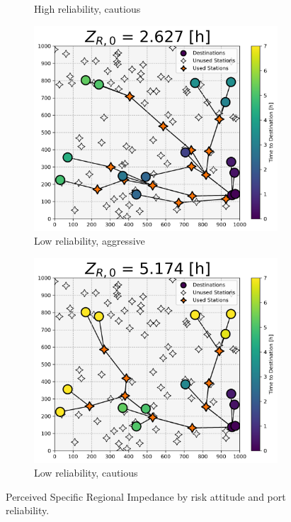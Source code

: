 \documentclass[11pt]{article}
\begin{document}
\begin{multicols}{2}
\begin{figure}[H]
\begin{subfigure}[t]{.5\linewidth}
		\caption{High reliability, cautious}
	\end{subfigure}
	\begin{subfigure}[t]{.5\linewidth}
		\centering\captionsetup{width = .8\linewidth}
		\includegraphics[width = \linewidth]{figs/random_example_low_reliability_aggressive_perceived.png}
		\caption{Low reliability, aggressive}
	\end{subfigure}%
	\begin{subfigure}[t]{.5\linewidth}
		\centering\captionsetup{width = .8\linewidth}
		\includegraphics[width = \linewidth]{figs/random_example_low_reliability_cautious_perceived.png}
		\caption{Low reliability, cautious}
	\end{subfigure}
	\caption{Perceived Specific Regional Impedance by risk attitude and port reliability.}
	\label{fig:perceived_srta_random_perceived}
\end{figure}


\end{multicols}
\end{document}

